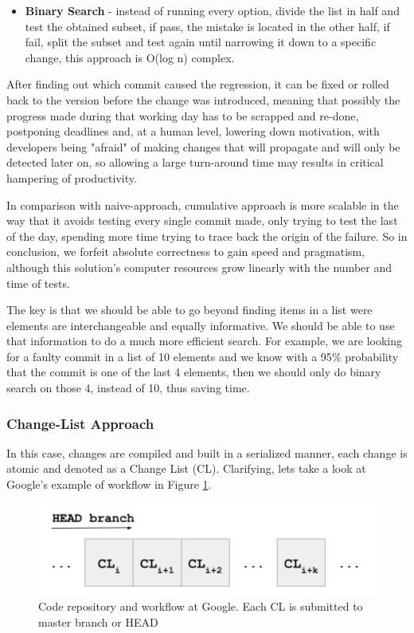 \begin{itemize}
	\item \textbf{Binary Search} - instead of running every option, divide the list in half and test the obtained subset, if pass, the mistake is located in the other half, if fail, split the subset and test again until narrowing it down to a specific change, this approach is O(log n) complex.
\end{itemize}

After finding out which commit caused the regression, it can be fixed or rolled back to the version before the change was introduced, meaning that possibly the progress made during that working day has to be scrapped and re-done, postponing deadlines and, at a human level, lowering down motivation, with developers being "afraid" of making changes that will propagate and will only be detected later on, so allowing a large turn-around time may results in critical hampering of productivity.
\par In comparison with naive-approach, cumulative approach is more scalable in the way that it avoids testing every single commit made, only trying to test the last of the day, spending more time trying to trace back the origin of the failure. So in conclusion, we forfeit absolute correctness to gain speed and pragmatism, although this solution's computer resources grow linearly with the number and time of tests. 
\par The key is that we should be able to go beyond finding items in a list were elements are interchangeable and equally informative. We should be able to use that information to do a much more efficient search. For example, we are looking for a faulty commit in a list of 10 elements and we know with a 95$\%$ probability that the commit is one of the last 4 elements, then we should only do binary search on those 4, instead of 10, thus saving time.


\subsubsection{Change-List Approach}

In this case, changes are compiled and built in a serialized manner, each change is atomic and denoted as a Change List (CL). Clarifying, lets take a look at Google's example of workflow in Figure \ref{googleWF}.

\begin{figure}[H]
	\centering
	\includegraphics[scale=0.5, width=0.6\linewidth]{figures/Google_WorkFlow.png}
	\caption{Code repository and workflow at Google. Each CL is submitted to master branch or HEAD \cite{Ziftci}}
	\label{googleWF}
\end{figure} 

